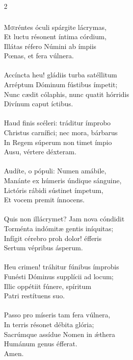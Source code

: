 \documentclass[9pt,twoside]{extarticle}
\begin{document}
\begin{multicols}{2}
\subsubsection*{\center {}}
\lettrine{M}œréntes óculi spárgite lácrymas,\\
Et luctu résonent íntima córdium,\\
Illátas réfero Númini ab ímpiis\\
Pœnas, et fera vúlnera.\\
\\
Accíncta heu! gládiis turba satéllitum\\
Arréptum Dóminum fústibus ímpetit;\\
Nunc cædit cólaphis, nunc quatit hórridis\\
Divínum caput íctibus.\\
\\
Haud finis scéleri: tráditur ímprobo\\
Christus carnífici; nec mora, bárbarus\\
In Regem súperum non timet ímpio\\
Ausu, vértere déxteram.\\
\\
Audíte, o pópuli: Numen amábile,\\
Manánte ex húmeris úndique sánguine,\\
Lictóris rábidi sústinet ímpetum,\\
Et vocem premit ínnocens.\\
\\
Quis non illácrymet? Jam nova cóndidit\\
Torménta indómitæ gentis iníquitas;\\
Infígit cérebro proh dolor! éfferis\\
Sertum vépribus ásperum.\\
\\
Heu crimen! tráhitur fúnibus ímprobis\\
Funésti Dóminus supplícii ad locum;\\
Illic oppétiit fúnere, spíritum\\
Patri restítuens suo.\\
\\
Passo pro míseris tam fera vúlnera,\\
In terris résonet débita glória;\\
Sacrúmque assídue Nomen in ǽthera\\
Humánum genus éfferat.\\
Amen.


\end{multicols}
\end{document}
